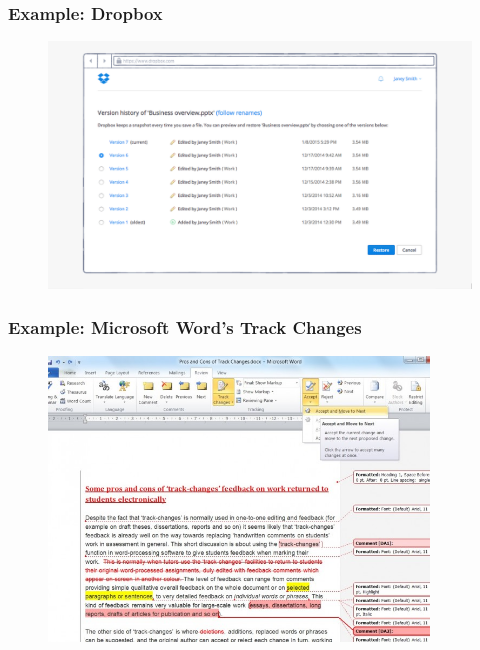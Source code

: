 \documentclass{beamer}
\begin{document}
\begin{frame}
   \frametitle{Example: Dropbox}
   \begin{figure}[htbp]
      \includegraphics[width=1.0\textwidth]{images/dropbox_view_version_history.png}
   \end{figure}
\end{frame}

\begin{frame}
   \frametitle{Example: Microsoft Word's Track Changes}
   \begin{figure}[htbp]
      \includegraphics[width=0.9\textwidth]{images/ms-word-track-changes.jpg}
   \end{figure}
\end{frame}
\end{document}
